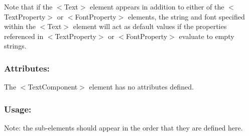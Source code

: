 Note that if the {\ttfamily $<$Text$>$} element appears in addition to either of the {\ttfamily $<$Text\+Property$>$} or {\ttfamily $<$Font\+Property$>$} elements, the string and font specified within the {\ttfamily $<$Text$>$} element will act as default values if the properties referenced in {\ttfamily $<$Text\+Property$>$} or {\ttfamily $<$Font\+Property$>$} evaluate to empty strings.\hypertarget{fal_element_ref_fal_elem_ref_sec_32_2}{}\subsubsection{Attributes\+:}\label{fal_element_ref_fal_elem_ref_sec_32_2}
The {\ttfamily $<$Text\+Component$>$} element has no attributes defined.\hypertarget{fal_element_ref_fal_elem_ref_sec_32_3}{}\subsubsection{Usage\+:}\label{fal_element_ref_fal_elem_ref_sec_32_3}
Note\+: the sub-\/elements should appear in the order that they are defined here.


